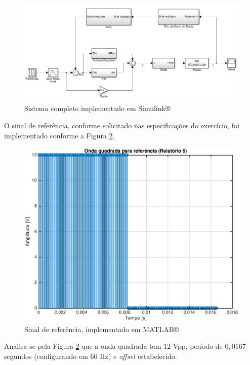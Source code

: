 	\begin{figure}[hbt]
	\centering
  \includegraphics[scale=.45]{Imagens/Relatorio6/SistemaCompleto}
  \caption{Sistema completo implementado em Simulink®}
  \label{sistemacompleto}
\end{figure}

	O sinal de referência, conforme solicitado nas especificações do exercício, foi implementado conforme a Figura \ref{referencia}.
	
	\begin{figure}[hbt]
	\centering
  \includegraphics[scale=.45]{Imagens/Relatorio6/quadrada_relatorio6}
  \caption{Sinal de referência, implementado em MATLAB®}
  \label{referencia}
\end{figure}

	Analisa-se pela Figura \ref{referencia} que a onda quadrada tem $12$ Vpp, período de $0,0167$ segundos (configurando em $60$ Hz) e \textit{offset} estabelecido.
	
